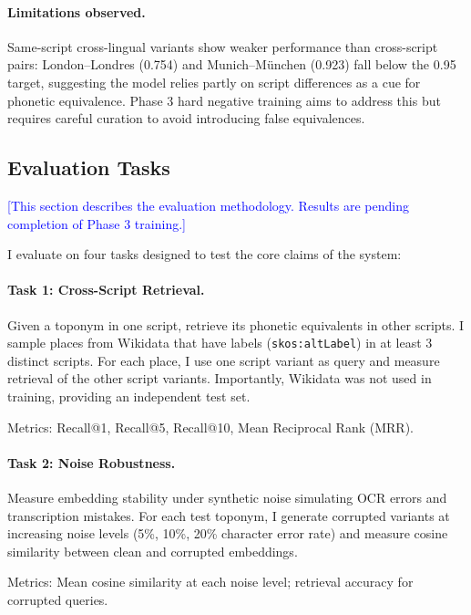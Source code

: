 \documentclass[11pt,a4paper]{article}
\newcommand{\placeholder}[1]{\textcolor{blue}{[#1]}}
\begin{document}
\paragraph{Limitations observed.} Same-script cross-lingual variants show weaker performance than cross-script pairs: London--Londres (0.754) and Munich--München (0.923) fall below the 0.95 target, suggesting the model relies partly on script differences as a cue for phonetic equivalence. Phase 3 hard negative training aims to address this but requires careful curation to avoid introducing false equivalences.

\subsection{Evaluation Tasks}

\placeholder{This section describes the evaluation methodology. Results are pending completion of Phase 3 training.}

I evaluate on four tasks designed to test the core claims of the system:

\paragraph{Task 1: Cross-Script Retrieval.} Given a toponym in one script, retrieve its phonetic equivalents in other scripts. I sample places from Wikidata that have labels (\texttt{skos:altLabel}) in at least 3 distinct scripts. For each place, I use one script variant as query and measure retrieval of the other script variants. Importantly, Wikidata was not used in training, providing an independent test set.

Metrics: Recall@1, Recall@5, Recall@10, Mean Reciprocal Rank (MRR).

\paragraph{Task 2: Noise Robustness.} Measure embedding stability under synthetic noise simulating OCR errors and transcription mistakes. For each test toponym, I generate corrupted variants at increasing noise levels (5\%, 10\%, 20\% character error rate) and measure cosine similarity between clean and corrupted embeddings.

Metrics: Mean cosine similarity at each noise level; retrieval accuracy for corrupted queries.
\end{document}
